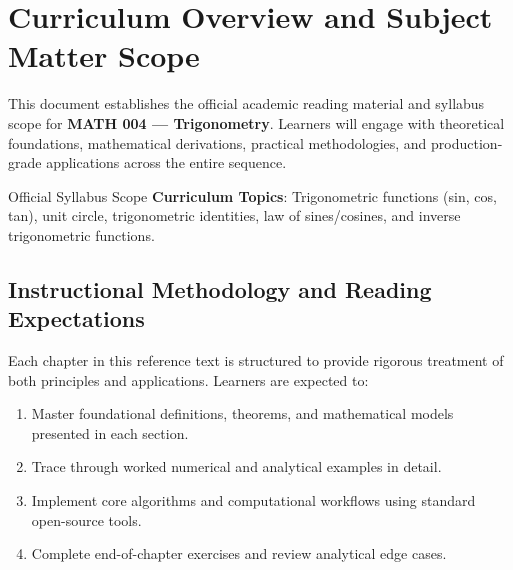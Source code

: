 \section{Curriculum Overview and Subject Matter Scope}

This document establishes the official academic reading material and syllabus scope for \textbf{MATH 004 --- Trigonometry}. Learners will engage with theoretical foundations, mathematical derivations, practical methodologies, and production-grade applications across the entire sequence.

\begin{InsightBox}{Official Syllabus Scope}
  \textbf{Curriculum Topics}: Trigonometric functions (sin, cos, tan), unit circle, trigonometric identities, law of sines/cosines, and inverse trigonometric functions.
\end{InsightBox}

\subsection{Instructional Methodology and Reading Expectations}

Each chapter in this reference text is structured to provide rigorous treatment of both principles and applications. Learners are expected to:
\begin{enumerate}
  \item Master foundational definitions, theorems, and mathematical models presented in each section.
  \item Trace through worked numerical and analytical examples in detail.
  \item Implement core algorithms and computational workflows using standard open-source tools.
  \item Complete end-of-chapter exercises and review analytical edge cases.
\end{enumerate}

